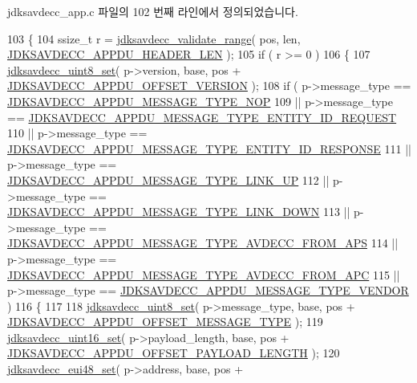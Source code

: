 jdksavdecc\+\_\+app.\+c 파일의 102 번째 라인에서 정의되었습니다.


\begin{DoxyCode}
103 \{
104     ssize\_t r = \hyperlink{group__util_ga9c02bdfe76c69163647c3196db7a73a1}{jdksavdecc\_validate\_range}( pos, len, 
      \hyperlink{group__appdu__offset_ga49c3326fdd0ad29a909e22f0945f2627}{JDKSAVDECC\_APPDU\_HEADER\_LEN} );
105     \textcolor{keywordflow}{if} ( r >= 0 )
106     \{
107         \hyperlink{group__endian_gaec8c2ce2f0bb781c6d77bd6a16b3ddcb}{jdksavdecc\_uint8\_set}( p->version, base, pos + 
      \hyperlink{group__appdu__offset_ga57b98282f7ecf5cc47f57d7398d6f07c}{JDKSAVDECC\_APPDU\_OFFSET\_VERSION} );
108         \textcolor{keywordflow}{if} ( p->message\_type == \hyperlink{group__appdu__constants_ga5046c58fc443b2e4ceff64635aa0ba8c}{JDKSAVDECC\_APPDU\_MESSAGE\_TYPE\_NOP}
109              || p->message\_type == 
      \hyperlink{group__appdu__constants_ga40c5d416d1df11d372c6695142d7c051}{JDKSAVDECC\_APPDU\_MESSAGE\_TYPE\_ENTITY\_ID\_REQUEST}
110              || p->message\_type == 
      \hyperlink{group__appdu__constants_ga81d2ca33e293bd267fbaf74406a45c5b}{JDKSAVDECC\_APPDU\_MESSAGE\_TYPE\_ENTITY\_ID\_RESPONSE}
111              || p->message\_type == \hyperlink{group__appdu__constants_gadae986916259f4936988bc0558770831}{JDKSAVDECC\_APPDU\_MESSAGE\_TYPE\_LINK\_UP}
112              || p->message\_type == \hyperlink{group__appdu__constants_ga8bf2da1e0f552a7ee69e8c75083e1615}{JDKSAVDECC\_APPDU\_MESSAGE\_TYPE\_LINK\_DOWN}
113              || p->message\_type == \hyperlink{group__appdu__constants_gaf8683fad673129f5cfaf7db9470435ba}{JDKSAVDECC\_APPDU\_MESSAGE\_TYPE\_AVDECC\_FROM\_APS}
114              || p->message\_type == \hyperlink{group__appdu__constants_gae1865f8d6a4ab7442673d2f81c5b13ab}{JDKSAVDECC\_APPDU\_MESSAGE\_TYPE\_AVDECC\_FROM\_APC}
115              || p->message\_type == \hyperlink{group__appdu__constants_ga44d11184e6ad9c978d342be41eace3f2}{JDKSAVDECC\_APPDU\_MESSAGE\_TYPE\_VENDOR}
       )
116         \{
117 
118             \hyperlink{group__endian_gaec8c2ce2f0bb781c6d77bd6a16b3ddcb}{jdksavdecc\_uint8\_set}( p->message\_type, base, pos + 
      \hyperlink{group__appdu__offset_ga13a78a093e9df487a35d7d57589eab98}{JDKSAVDECC\_APPDU\_OFFSET\_MESSAGE\_TYPE} );
119             \hyperlink{group__endian_ga14b9eeadc05f94334096c127c955a60b}{jdksavdecc\_uint16\_set}( p->payload\_length, base, pos + 
      \hyperlink{group__appdu__offset_ga38243b0c214e3270829997effb1aafec}{JDKSAVDECC\_APPDU\_OFFSET\_PAYLOAD\_LENGTH} );
120             \hyperlink{group__eui48_ga469d246a17ff1ee085030ee7dae57c5e}{jdksavdecc\_eui48\_set}( p->address, base, pos + 

\end{DoxyCode}
